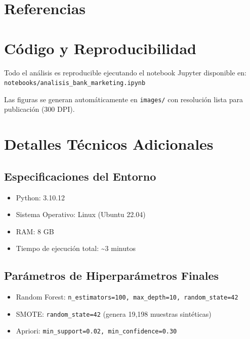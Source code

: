 \documentclass[12pt,letterpaper]{article}
\begin{document}
\section{Referencias}




\appendix
\section{Código y Reproducibilidad}

Todo el análisis es reproducible ejecutando el notebook Jupyter disponible en:
\texttt{notebooks/analisis\_bank\_marketing.ipynb}

Las figuras se generan automáticamente en \texttt{images/} con resolución lista para publicación (300 DPI).

\section{Detalles Técnicos Adicionales}

\subsection{Especificaciones del Entorno}
\begin{itemize}
    \item Python: 3.10.12
    \item Sistema Operativo: Linux (Ubuntu 22.04)
    \item RAM: 8 GB
    \item Tiempo de ejecución total: \textasciitilde3 minutos
\end{itemize}

\subsection{Parámetros de Hiperparámetros Finales}
\begin{itemize}
    \item Random Forest: \texttt{n\_estimators=100, max\_depth=10, random\_state=42}
    \item SMOTE: \texttt{random\_state=42} (genera 19,198 muestras sintéticas)
    \item Apriori: \texttt{min\_support=0.02, min\_confidence=0.30}
\end{itemize}
\end{document}

